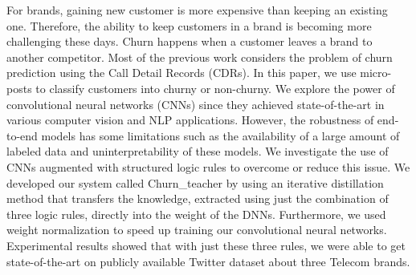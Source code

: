 For brands, gaining new customer is more expensive than keeping an existing one. Therefore, the ability to keep customers in a brand is becoming more challenging these days.  Churn happens when a customer leaves a brand to another competitor. Most of the previous work considers the problem of churn prediction using the Call Detail Records (CDRs). In this paper, we use micro-posts to classify customers into churny or non-churny. We explore the power of convolutional neural networks (CNNs) since they achieved state-of-the-art in various computer vision and NLP applications. However, the robustness of end-to-end models has some limitations such as the availability of a large amount of labeled data and uninterpretability of these models. We investigate the use of CNNs augmented with structured logic rules to overcome or reduce this issue. We developed our system called Churn\_teacher by using an iterative distillation method that transfers the knowledge, extracted using just the combination of three logic rules, directly into the weight of the DNNs. Furthermore, we used weight normalization to speed up training our convolutional neural networks. Experimental results showed that with just these three rules, we were able to get state-of-the-art on publicly available Twitter dataset about three Telecom brands.
